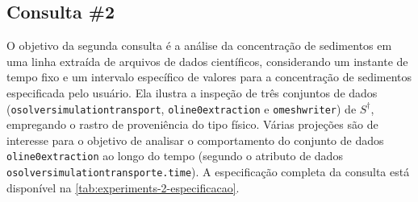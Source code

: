 \clearpage

\subsection{Consulta \#2}

%

%

O objetivo da segunda consulta é a análise da concentração de sedimentos em uma linha extraída de arquivos de dados científicos, considerando um instante de tempo fixo e um intervalo específico de valores para a concentração de sedimentos especificada pelo usuário. Ela ilustra a inspeção de três conjuntos de dados (\texttt{osolversimulationtransport}, \texttt{oline0extraction} e \texttt{omeshwriter}) de \(S^{\dagger}\), empregando o rastro de proveniência do tipo físico. Várias projeções são de interesse para o objetivo de analisar o comportamento do conjunto de dados \texttt{oline0extraction} ao longo do tempo (segundo o atributo de dados \texttt{osolversimulationtransporte.time}). A especificação completa da consulta está disponível na \autoref{tab:experiments-2-especificacao}.

